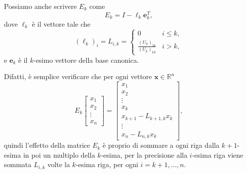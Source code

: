 \documentclass[a4paper]{report}
\theoremstyle{definiton}
\theoremstyle{remark}
\newcommand{\x}{\mathbf{x}}
\begin{document}
Possiamo anche scrivere $E_k$ come
\[
E_k = I - \boldsymbol{\ell}_k \mathbf{e}_k^T,
\]
dove $\boldsymbol{\ell}_k$ è il vettore tale che 
\[
(\boldsymbol{\ell}_k)_i = L_{i,k} = \begin{cases}
0 & i \leq k,\\
\frac{(U_k)_{ik}}{(U_k)_{kk}} & i>k,
\end{cases}
\]
e $\mathbf{e}_k$ è il $k$-esimo vettore della base canonica.

Difatti, è semplice verificare che per ogni vettore $\x\in\mathbb{R}^n$ 
\[
E_k \begin{bmatrix}
    x_1\\x_2\\ \vdots \\ x_n
\end{bmatrix}
=
\begin{bmatrix}
    x_1 \\ x_2\\ \vdots \\ x_k \\ x_{k+1} - L_{k+1,k}x_k\\
    \vdots \\
    x_n - L_{n,k}x_k
\end{bmatrix},
\]
quindi l'effetto della matrice $E_k$ è proprio di sommare a ogni riga dalla $k+1$-esima in poi un multiplo della $k$-esima, per la precisione alla $i$-esima riga viene sommata $L_{i,k}$ volte la $k$-esima riga, per ogni $i=k+1,\dots,n$.
\end{document}
